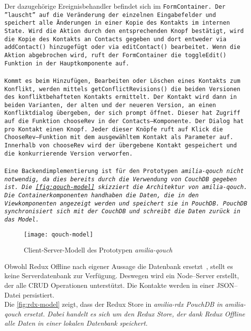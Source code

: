 Der dazugehörige Ereignisbehandler befindet sich im \tt{FormContainer}. 
Der ''lauscht'' auf die Veränderung der einzelnen Eingabefelder und speichert alle Änderungen in einer Kopie des Kontakts im internen State.
Wird die Aktion durch den entsprechenden Knopf bestätigt, wird die Kopie des Kontakts an \tt{Contacts} gegeben und dort entweder via \tt{addContact()} hinzugefügt oder via \tt{editContact()} bearbeitet.
Wenn die Aktion abgebrochen wird, ruft der \tt{FormContainer} die \tt{toggleEdit()} Funktion in der Hauptkomponente auf.\\\\
%
%
Kommt es beim Hinzufügen, Bearbeiten oder Löschen eines Kontakts zum Konflikt, werden mittels \tt{getConflictRevisions()} die beiden Versionen des konfliktbehafteten Kontakts ermittelt.
Der Kontakt wird dann in beiden Varianten, der alten und der neueren Version, an einen Konfliktdialog übergeben, der sich prompt öffnet.
Dieser hat Zugriff auf die Funktion \tt{chooseRev} in der \tt{Contacts}--Komponente.
Der Dialog hat pro Kontakt einen Knopf. Jeder dieser Knöpfe ruft auf Klick die \tt{ChooseRev}--Funktion mit dem ausgewähltem Kontakt als Parameter auf.
Innerhalb von \tt{chooseRev} wird der übergebene Kontakt gespeichert und die konkurrierende Version verworfen.\\\\
%
%
Eine Backendimplementierung ist für den Prototypen \it{amilia-qouch} nicht notwendig, da dies bereits durch die Verwendung von CouchDB gegeben ist.
Die \autoref{fig:qouch-model} skizziert die Architektur von \it{amilia-qouch}.
Die Containerkomponenten handhaben die Daten, die in den Viewkomponenten angezeigt werden und speichert sie in PouchDB.
PouchDB synchronisiert sich mit der CouchDB und schreibt die Daten zurück in das Model.
\begin{figure}[H]
  \centering
  \texttt{[image: qouch-model]}
  \grayRule
  \caption{Client-Server-Modell des Prototypen \it{amilia-qouch}}
  \label{fig:qouch-model}
\end{figure}
%
Obwohl Redux Offline nach eigener Aussage die Datenbank ersetzt~\cite{redux-offline}, stellt es keine Serverdatenbank zur Verfügung.
Deswegen wird ein Node--Server erstellt, der alle \gls{CRUD} Operationen unterstützt.
Die Kontakte werden in einer \gls{JSON}--Datei persistiert.\\
Die \autoref{fig:rdx-model} zeigt, dass der Redux Store in \it{amilia-rdx} PouchDB in \it{amilia-qouch} ersetzt.
Dabei handelt es sich um den Redux Store, der dank Redux Offline alle Daten in einer lokalen Datenbank speichert.
